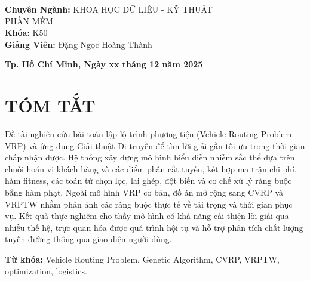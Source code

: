 \documentclass[12pt,a4paper]{article}
\numberwithin{figure}{subsection}
\numberwithin{table}{subsection}
\begin{document}
\begin{titlepage}
\begin{flushleft}
\hspace{3.5cm} \textbf{Chuyên Ngành:} KHOA HỌC DỮ LIỆU - \textcolor{uehred}{KỸ THUẬT} \\[0.1cm]
\hspace{3.5cm} \textcolor{uehred}{PHẦN MỀM} \\[0.2cm]
\hspace{3.5cm} \textbf{Khóa:} \textcolor{uehred}{K50} \\[0.8cm]
\hspace{3.5cm} \textbf{Giảng Viên:} Đặng Ngọc Hoàng Thành
\end{flushleft}

\vfill

{\bfseries \small Tp. Hồ Chí Minh, Ngày xx tháng 12 năm 2025}

\end{titlepage}

\newpage
\tableofcontents
\thispagestyle{empty} 

\newpage
\thispagestyle{empty}

\section*{TÓM TẮT}
{}

Đề tài nghiên cứu bài toán lập lộ trình phương tiện (Vehicle Routing Problem -- VRP) và ứng dụng Giải thuật Di truyền để tìm lời giải gần tối ưu trong thời gian chấp nhận được. Hệ thống xây dựng mô hình biểu diễn nhiễm sắc thể dựa trên chuỗi hoán vị khách hàng và các điểm phân cắt tuyến, kết hợp ma trận chi phí, hàm fitness, các toán tử chọn lọc, lai ghép, đột biến và cơ chế xử lý ràng buộc bằng hàm phạt. Ngoài mô hình VRP cơ bản, đồ án mở rộng sang CVRP và VRPTW nhằm phản ánh các ràng buộc thực tế về tải trọng và thời gian phục vụ. Kết quả thực nghiệm cho thấy mô hình có khả năng cải thiện lời giải qua nhiều thế hệ, trực quan hóa được quá trình hội tụ và hỗ trợ phân tích chất lượng tuyến đường thông qua giao diện người dùng.

\noindent\textbf{Từ khóa:} Vehicle Routing Problem, Genetic Algorithm, CVRP, VRPTW, optimization, logistics.

\vspace{1.2cm}
\end{document}

